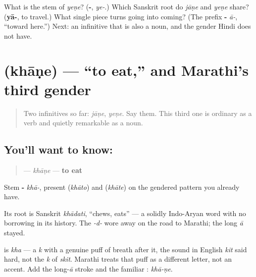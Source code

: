 \begin{tcolorbox}[breakable,colback=teal!4,colframe=teal!35!black,title={Before you move on}]
What is the stem of \emph{yeṇe}? (\textbf{-}, \emph{ye-}.) Which Sanskrit root do \emph{jāṇe} and \emph{yeṇe} share? (\textbf{yā-}, to travel.) What single piece turns going into coming? (The prefix \textbf{-} \emph{ā-}, \textquotedblleft{}toward here.\textquotedblright{}) Next: an infinitive that is also a noun, and the gender Hindi does not have.
\end{tcolorbox}
\section[khāṇe]{ (khāṇe) — \textquotedblleft{}to eat,\textquotedblright{} and Marathi's third gender}

\label{lesson:MR-C07-khane}



\begin{quote}
Two infinitives so far: \emph{jāṇe}, \emph{yeṇe}. Say them. This third one is ordinary as a verb and quietly remarkable as a noun.
\end{quote}

\subsection*{You'll want to know: }
\begin{quote}
\textbf{} — \emph{khāṇe} — \textbf{to eat}
\end{quote}

Stem \textbf{-} \emph{khā-}, present \textbf{} (\emph{khāto}) and \textbf{} (\emph{khāte}) on the gendered pattern you already have.

Its root is Sanskrit \textbf{} \emph{khādati}, \textquotedblleft{}chews, eats\textquotedblright{} — a solidly Indo-Aryan word with no borrowing in its history. The \emph{-d-} wore away on the road to Marathi; the long \emph{ā} stayed.

\begin{sounds}
\textbf{} is \emph{kha} — a \emph{k} with a genuine puff of breath after it, the sound in English \emph{kit} said hard, not the \emph{k} of \emph{skit}. Marathi treats that puff as a different letter, not an accent. Add the long-\emph{ā} stroke and the familiar \textbf{}: \emph{khā-ṇe}.
\end{sounds}

